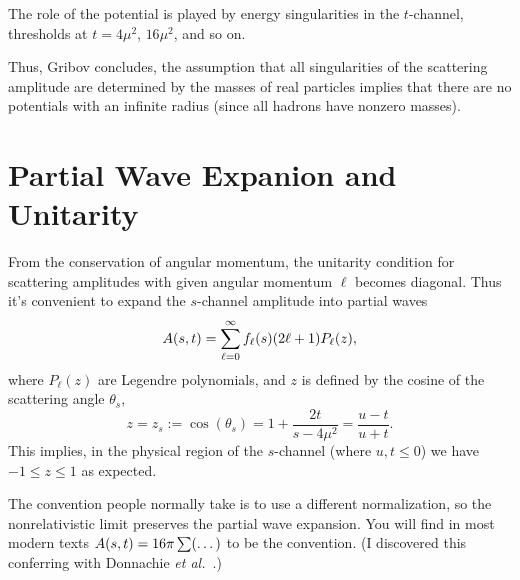  The role of the potential is played by energy
singularities in the $t$-channel, thresholds at $t=4\mu^{2}$,
$16\mu^{2}$, and so on.

\M[-1]
Thus, Gribov concludes, the assumption that all singularities of the
scattering amplitude are determined by the masses of real particles
implies that there are no potentials with an infinite radius (since all
hadrons have nonzero masses).

\section{Partial Wave Expanion and Unitarity}

From the conservation of angular momentum, the unitarity condition for
scattering amplitudes with given angular momentum $\ell$ becomes
diagonal. Thus it's convenient to expand the $s$-channel amplitude into
partial waves
\begin{equation}
A(s,t) = \sum^{\infty}_{\ell=0}f_{\ell}(s)(2\ell+1)P_{\ell}(z),
\end{equation}
where $P_{\ell}(z)$ are Legendre polynomials, and $z$ is defined by the
cosine of the scattering angle $\theta_{s}$,
\begin{equation}
z = z_{s} := \cos(\theta_{s}) = 1 + \frac{2t}{s-4\mu^{2}}=\frac{u-t}{u+t}.
\end{equation}
This implies, in the physical region of the $s$-channel (where
$u,t\leq0$) we have $-1\leq z\leq 1$ as expected.

The convention people normally take is to use a different normalization,
so the nonrelativistic limit preserves the partial wave expansion. You
will find in most modern texts $A(s,t)=16\pi\sum(\dots)$ to be
the convention. (I discovered this conferring with Donnachie \textit{et al.}~\cite{Donnachie:2002en}.)

